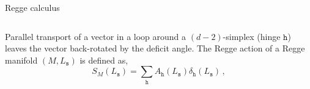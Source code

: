 \documentclass{beamer}
\begin{document}
\begin{frame}{Regge calculus}
    \begin{list}{\maltese}{\leftmargin=1em \itemindent=0em}
        \item<1-> \noindent
        \begin{minipage}{\linewidth}
            \begin{columns}
            \end{columns}
        \end{minipage}
        \item<2->[] \hfill
        \item<2-> \noindent
        \begin{minipage}{\linewidth}
            \begin{columns}
                Parallel transport of a vector in a loop around a $(d-2)$-simplex (hinge $\mathtt{h}$) leaves the vector back-rotated by the deficit angle. The Regge action of a Regge manifold $(M,L_\mathtt{s})$ is defined as,
                \begin{equation}
                    S_M(L_\mathtt{s})=\sum_\mathtt{h}A_\mathtt{h}(L_\mathtt{s})\delta_\mathtt{h}(L_\mathtt{s})\,,
                \end{equation}

\end{columns}
\end{minipage}
\end{list}
\end{frame}
\end{document}
